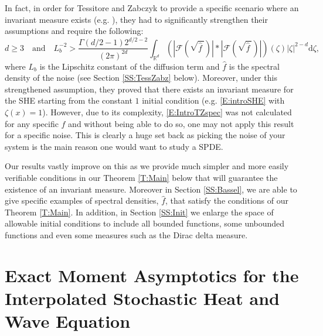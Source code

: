 \documentclass[12pt]{report}
\theoremstyle{plain}
\theoremstyle{definition}
\numberwithin{equation}{section}
\newcommand{\R}{\mathbb{R}}
\newcommand{\ud}{\ensuremath{ \mathrm{d} }}
\begin{document}
In fact, in order for Tessitore and Zabczyk to provide a specific scenario where an invariant measure exists (e.g. \cite[Theorem 3.3]{tessitore.zabczyk:98:invariant}), they had to significantly strengthen their assumptions and require the following:
 \begin{equation} \label{E:IntroTZspec}
d\ge 3 \quad \text{and} \quad
L_b^{-2}> \frac{\Gamma(d/2 -1)2^{d/2-2}}{(2\pi)^{2d}} \int_{\R^d} \left(\left|  \mathcal{F}\left(\sqrt{ \widehat{f}\: }\right) \right| * \left| \mathcal{F}\left(\sqrt{ \widehat{f}\: }\right)\right|\right) (\zeta) |\zeta|^{2-d} \ud \zeta,
\end{equation}
where $L_b$ is the Lipschitz constant of the diffusion term and $\hat{f}$ is the spectral density of the noise (see Section \ref{SS:TessZabz} below). Moreover, under this strengthened assumption, they proved that there exists an invariant measure for the SHE starting from the constant $1$ initial condition (e.g. \eqref{E:introSHE} with $\zeta(x) = 1$). However, due to its complexity, \eqref{E:IntroTZspec} was not calculated for any specific $\widehat{f}$ and without being able to do so, one may not apply this result for a specific noise. This is clearly a huge set back as picking the noise of your system is the main reason one would want to study a SPDE.

Our results vastly improve on this as we provide much simpler and more easily verifiable conditions in our Theorem \ref{T:Main} below that will guarantee the existence of an invariant measure. Moreover in Section \ref{SS:Bassel}, we are able to give specific examples of spectral densities, $\widehat{f}$, that satisfy the conditions of our Theorem \ref{T:Main}. In addition, in Section \ref{SS:Init} we enlarge the space of allowable initial conditions to include all bounded functions, some unbounded functions and even some measures such as the Dirac delta measure. 

\chapter{ \normalfont Exact Moment Asymptotics for the Interpolated Stochastic Heat and Wave Equation} \label{Ch:ISHWEmom}
\end{document}
